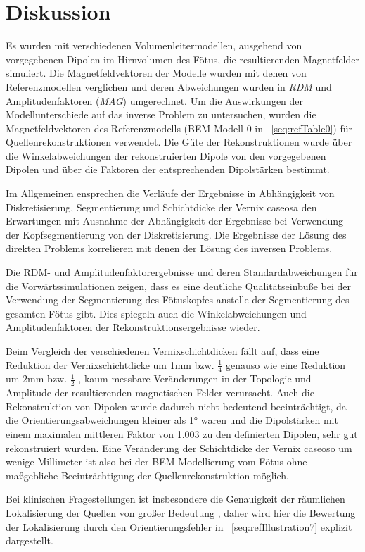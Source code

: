 \chapter{Diskussion}
Es wurden mit verschiedenen Volumenleitermodellen, ausgehend von
vorgegebenen Dipolen im Hirnvolumen des Fötus, die resultierenden
Magnetfelder simuliert. Die Magnetfeldvektoren der Modelle wurden mit
denen von Referenzmodellen verglichen und deren Abweichungen wurden in
\textit{RDM} und Amplitudenfaktoren (\textit{MAG}) umgerechnet. Um die
Auswirkungen der Modellunterschiede auf das inverse Problem zu
untersuchen, wurden die Magnetfeldvektoren des Referenzmodells
(BEM-Modell 0 in \tablename~\ref{seq:refTable0}) für
Quellenrekonstruktionen verwendet. Die Güte der Rekonstruktionen wurde
über die Winkelabweichungen der rekonstruierten Dipole von den
vorgegebenen Dipolen und über die Faktoren der entsprechenden
Dipolstärken bestimmt.

Im Allgemeinen ensprechen die Verläufe der Ergebnisse in Abhängigkeit
von Diskretisierung, Segmentierung und Schichtdicke der Vernix caseosa
den Erwartungen mit Ausnahme der Abhängigkeit der Ergebnisse bei
Verwendung der Kopfsegmentierung von der Diskretisierung. Die
Ergebnisse der Lösung des direkten Problems korrelieren mit denen der
Lösung des inversen Problems.

Die RDM- und Amplitudenfaktorergebnisse und deren Standardabweichungen
für die Vorwärtssimulationen zeigen, dass es eine deutliche
Qualitätseinbuße bei der Verwendung der Segmentierung des Fötuskopfes
anstelle der Segmentierung des gesamten Fötus gibt. Dies spiegeln auch
die Winkelabweichungen und Amplitudenfaktoren der
Rekonstruktionsergebnisse wieder.

Beim Vergleich der verschiedenen Vernixschichtdicken fällt auf, dass
eine Reduktion der Vernixschichtdicke um 1mm bzw. $\frac{1}{4}$ genauso
wie eine Reduktion um 2mm bzw. $\frac{1}{2}$ , kaum messbare
Veränderungen in der Topologie und Amplitude der resultierenden
magnetischen Felder verursacht. Auch die Rekonstruktion von Dipolen
wurde dadurch nicht bedeutend beeinträchtigt, da die
Orientierungsabweichungen kleiner als 1° waren und die Dipolstärken mit
einem maximalen mittleren Faktor von 1.003 zu den definierten Dipolen,
sehr gut rekonstruiert wurden. Eine Veränderung der Schichtdicke der
Vernix caseoso um wenige Millimeter ist also bei der BEM-Modellierung
vom Fötus ohne maßgebliche Beeinträchtigung der Quellenrekonstruktion
möglich.

Bei klinischen Fragestellungen ist insbesondere die Genauigkeit der
räumlichen Lokalisierung der Quellen von großer Bedeutung \cite{a2},
daher wird hier die Bewertung der Lokalisierung durch den
Orientierungsfehler in \figurename~\ref{seq:refIllustration7} explizit
dargestellt.



